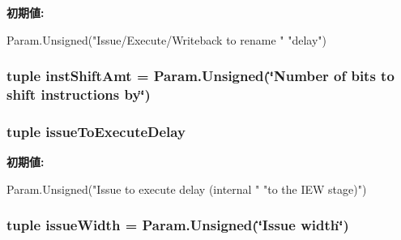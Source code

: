 \label{classSimpleOzoneCPU_1_1SimpleOzoneCPU_a54dd22869ae708c0b6bffab65d4d03c5}
{\bfseries 初期値:}
\begin{DoxyCode}
Param.Unsigned("Issue/Execute/Writeback to rename "
               "delay")
\end{DoxyCode}
\hypertarget{classSimpleOzoneCPU_1_1SimpleOzoneCPU_a04bfc27685a42245093252b2fab219a5}{
\subsubsection[{instShiftAmt}]{\setlength{\rightskip}{0pt plus 5cm}tuple {\bf instShiftAmt} = Param.Unsigned(\char`\"{}Number of bits to shift instructions by\char`\"{})}}
\label{classSimpleOzoneCPU_1_1SimpleOzoneCPU_a04bfc27685a42245093252b2fab219a5}
\hypertarget{classSimpleOzoneCPU_1_1SimpleOzoneCPU_ab445ea6366a58d7753b058bd794548a8}{
\subsubsection[{issueToExecuteDelay}]{\setlength{\rightskip}{0pt plus 5cm}tuple {\bf issueToExecuteDelay}}}
\label{classSimpleOzoneCPU_1_1SimpleOzoneCPU_ab445ea6366a58d7753b058bd794548a8}
{\bfseries 初期値:}
\begin{DoxyCode}
Param.Unsigned("Issue to execute delay (internal "
              "to the IEW stage)")
\end{DoxyCode}
\hypertarget{classSimpleOzoneCPU_1_1SimpleOzoneCPU_a1e02adcb8a1e64fc82f4b389844d2f68}{
\subsubsection[{issueWidth}]{\setlength{\rightskip}{0pt plus 5cm}tuple {\bf issueWidth} = Param.Unsigned(\char`\"{}Issue {\bf width}\char`\"{})}}
